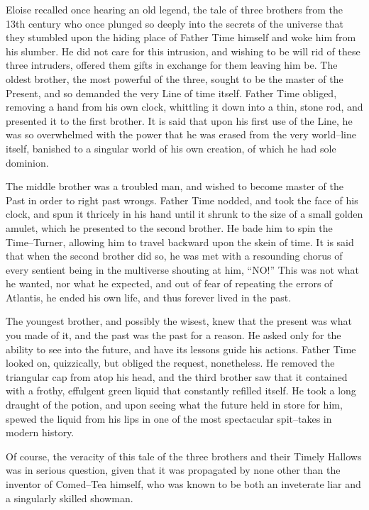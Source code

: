 Eloise recalled once hearing an old legend, the tale of three brothers from the 13th century who once plunged so deeply into the secrets of the universe that they stumbled upon the hiding place of Father Time himself and woke him from his slumber. He did not care for this intrusion, and wishing to be will rid of these three intruders, offered them gifts in exchange for them leaving him be. The oldest brother, the most powerful of the three, sought to be the master of the Present, and so demanded the very Line of time itself. Father Time obliged, removing a hand from his own clock, whittling it down into a thin, stone rod, and presented it to the first brother. It is said that upon his first use of the Line, he was so overwhelmed with the power that he was erased from the very world\mbox{--}line itself, banished to a singular world of his own creation, of which he had sole dominion.

The middle brother was a troubled man, and wished to become master of the Past in order to right past wrongs. Father Time nodded, and took the face of his clock, and spun it thricely in his hand until it shrunk to the size of a small golden amulet, which he presented to the second brother. He bade him to spin the Time\mbox{--}Turner, allowing him to travel backward upon the skein of time. It is said that when the second brother did so, he was met with a resounding chorus of every sentient being in the multiverse shouting at him, “NO!” This was not what he wanted, nor what he expected, and out of fear of repeating the errors of Atlantis, he ended his own life, and thus forever lived in the past.

The youngest brother, and possibly the wisest, knew that the present was what you made of it, and the past was the past for a reason. He asked only for the ability to see into the future, and have its lessons guide his actions. Father Time looked on, quizzically, but obliged the request, nonetheless. He removed the triangular cap from atop his head, and the third brother saw that it contained with a frothy, effulgent green liquid that constantly refilled itself. He took a long draught of the potion, and upon seeing what the future held in store for him, spewed the liquid from his lips in one of the most spectacular spit\mbox{--}takes in modern history.

Of course, the veracity of this tale of the three brothers and their Timely Hallows was in serious question, given that it was propagated by none other than the inventor of Comed\mbox{--}Tea himself, who was known to be both an inveterate liar and a singularly skilled showman.

